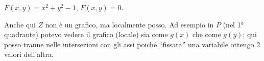 \begin{example}[ESE 3]
$F(x, y) = x^2 + y^2 - 1$, \qquad $F(x, y) = 0$.

\begin{center}
\end{center}

Anche qui $Z$ non è un grafico, ma localmente posso. Ad esempio in $P$ (nel 1° quadrante) potevo vedere il grafico (locale) sia come $g(x)$ che come $g(y)$; qui posso tranne nelle intersezioni con gli assi poiché ``fissata'' una variabile ottengo $2$ valori dell'altra.
\end{example}

